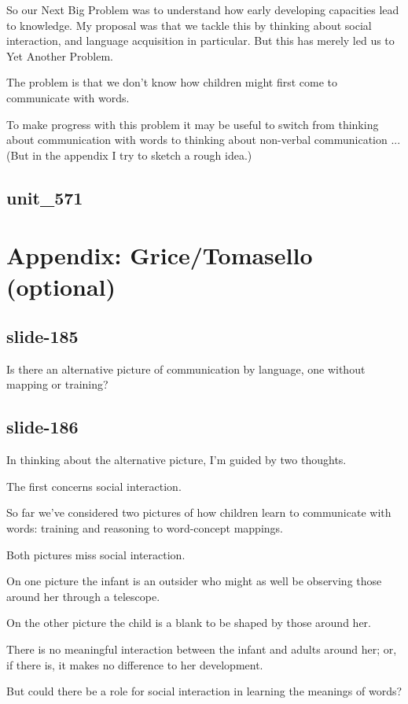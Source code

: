 \documentclass[12pt,\papersize]{extarticle}
\begin{document}
So our Next Big Problem was to understand how early developing capacities lead to knowledge.
My proposal was that we tackle this by thinking about social interaction, and language 
acquisition in particular.
But this has merely led us to Yet Another Problem.
 
The problem is that we don't know how children might first come to communicate with words.
 
To make progress with this problem it may be useful to switch from thinking about communication
with words to thinking about non-verbal communication ...
(But in the appendix I try to sketch a rough idea.)
 
\subsection{unit\_571}
 
 
\section{Appendix: Grice/Tomasello (optional)}
 
\subsection{slide-185}
Is there an alternative picture of communication by language, one without mapping or training?
 
\subsection{slide-186}
In thinking about the alternative picture, I'm guided by two thoughts.
 
The first concerns social interaction.
 
So far we've considered two pictures of how children learn to communicate with words: training and reasoning to word-concept mappings.
 
Both pictures miss social interaction.
 
On one picture the infant is an outsider who might as well be observing those around her through a telescope.
 
On the other picture the child is a blank to be shaped by those around her.
 
There is no meaningful interaction between the infant and adults around her; or, if there is, it makes no difference to her development.
 
But could there be a role for social interaction in learning the meanings of words?
 
\end{document}
